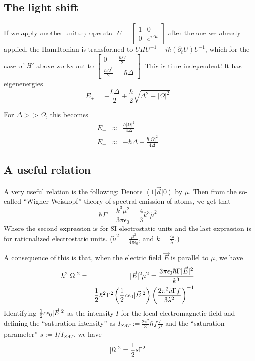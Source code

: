 \documentclass[aps,twocolumn,prb,floatfix,amsmath,amssymb,groupedaddress]{revtex4}
\begin{document}
\subsection{The light shift}
If we apply another unitary operator $U = 
\begin{bmatrix}
1 & 0 \\
0 & e^{i\Delta t}
\end{bmatrix}
$ after the one we already applied, the Hamiltonian is transformed to $UHU^{-1} + i\hbar(\partial_t U) U^{-1}$, which for the case of $H'$ above works out to $
\begin{bmatrix}
0 & \frac{\hbar\Omega}{2} \\
\frac{\hbar\Omega^*}{2} & -\hbar\Delta 
\end{bmatrix}.
$  This is time independent!  It has eigenenergies
\begin{equation}
E_{\pm} = -\frac{\hbar\Delta}{2} \pm \frac{\hbar}{2} \sqrt{\Delta^2 + |\Omega|^2}
\end{equation}

For $\Delta >> \Omega$, this becomes 
\begin{eqnarray}
E_{+} & \approx &  \frac{\hbar|\Omega|^2}{4\Delta}\\
E_{-} & \approx &  -\hbar\Delta - \frac{\hbar |\Omega|^2}{4\Delta}
\label{approxLightShift}
\end{eqnarray}

\subsection{A useful relation}
A very useful relation is the following:  Denote $\left<1\right|\vec{d}\left|0\right>$ by ${\mu}$.  Then from the so-called ``Wigner-Weiskopf'' theory of spectral emission of atoms, we get that 
\begin{equation}
\hbar\Gamma = \frac{k^3\mu^2}{3\pi\epsilon_0} = \frac{4}{3}k^3\tilde{\mu}^2
\end{equation}
Where the second expression is for SI electrostatic units and the last expression is for rationalized electrostatic units.  ($\tilde{\mu}^2 = \frac{\mu^2}{4\pi\epsilon_0}$, and $k = \frac{2\pi}{\lambda}$.)

A consequence of this is that, when the electric field $\vec{E}$ is parallel to $\mu$, we have 
\begin{eqnarray*}
\hbar^2|\Omega|^2 & = & |\vec{E}|^2\mu^2 = \frac{3\pi\epsilon_0 \hbar\Gamma |\vec{E}|^2}{k^3} \\
& = & {\frac{1}{2}}\hbar^2\Gamma^2 \left({\frac{1}{2}} c \epsilon_0|\vec{E}|^2\right) \left(\frac{2\pi^2\hbar\Gamma f}{3\lambda^2}\right)^{-1}
\end{eqnarray*}
Identifying ${\frac{1}{2}} c\epsilon_0 |\vec{E}|^2$ as the intensity $I$ for the local electromagnetic field and defining the ``saturation intensity'' as $I_{SAT}:= \frac{2\pi^2}{3}\hbar f \frac{\Gamma}{\lambda^2}$ and the ``saturation parameter'' $s:=I/I_{SAT}$, we have 
\begin{equation}
|\Omega|^2 = {\frac{1}{2}} s \Gamma^2
\label{usefulRelation}
\end{equation}
\end{document}
